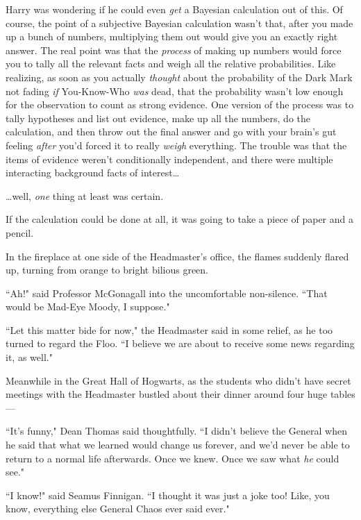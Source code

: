 Harry was wondering if he could even \emph{get} a Bayesian calculation out of this. Of course, the point of a subjective Bayesian calculation wasn't that, after you made up a bunch of numbers, multiplying them out would give you an exactly right answer. The real point was that the \emph{process} of making up numbers would force you to tally all the relevant facts and weigh all the relative probabilities. Like realizing, as soon as you actually \emph{thought} about the probability of the Dark Mark not fading \emph{if} You-Know-Who \emph{was} dead, that the probability wasn't low enough for the observation to count as strong evidence. One version of the process was to tally hypotheses and list out evidence, make up all the numbers, do the calculation, and then throw out the final answer and go with your brain's gut feeling \emph{after} you'd forced it to really \emph{weigh} everything. The trouble was that the items of evidence weren't conditionally independent, and there were multiple interacting background facts of interest{\ldots}

{\ldots}well, \emph{one} thing at least was certain.

If the calculation could be done at all, it was going to take a piece of paper and a pencil.

In the fireplace at one side of the Headmaster's office, the flames suddenly flared up, turning from orange to bright bilious green.

``Ah!" said Professor McGonagall into the uncomfortable non-silence. ``That would be Mad-Eye Moody, I suppose."

``Let this matter bide for now," the Headmaster said in some relief, as he too turned to regard the Floo. ``I believe we are about to receive some news regarding it, as well."


Meanwhile in the Great Hall of Hogwarts, as the students who didn't have secret meetings with the Headmaster bustled about their dinner around four huge tables—

``It's funny," Dean Thomas said thoughtfully. ``I didn't believe the General when he said that what we learned would change us forever, and we'd never be able to return to a normal life afterwards. Once we knew. Once we saw what \emph{he} could see."

``I know!" said Seamus Finnigan. ``I thought it was just a joke too! Like, you know, everything else General Chaos ever said ever."

